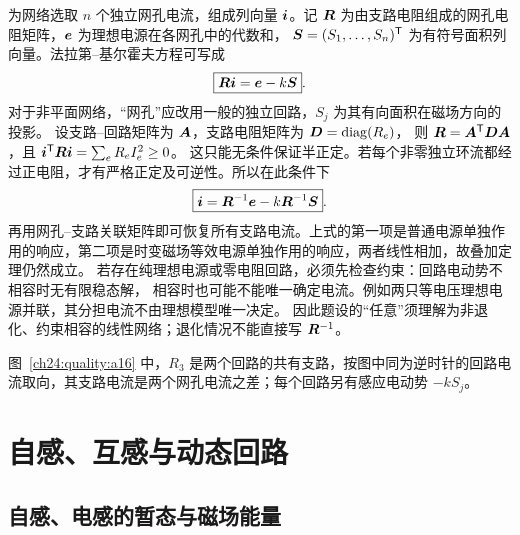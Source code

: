 {\begin{xesolution}
为网络选取 $n$ 个独立网孔电流，组成列向量 $\bm{i}$。记 $\bm{R}$ 为由支路电阻组成的网孔电阻矩阵，$\bm{e}$ 为理想电源在各网孔中的代数和，
$\bm{S}=(S_1,\ldots,S_n)^{\mathsf T}$ 为有符号面积列向量。法拉第--基尔霍夫方程可写成
\begin{equation}
  \boxed{\bm{R}\bm{i}=\bm{e}-k\bm{S}}.
\end{equation}
对于非平面网络，“网孔”应改用一般的独立回路，$S_j$ 为其有向面积在磁场方向的投影。
设支路--回路矩阵为 $\bm{A}$，支路电阻矩阵为 $\bm{D}=\operatorname{diag}(R_e)$，
则 $\bm{R}=\bm{A}^{\mathsf T}\bm{D}\bm{A}$，且
$\bm{i}^{\mathsf T}\bm{R}\bm{i}=\sum_eR_eI_e^2\ge0$。
这只能无条件保证半正定。若每个非零独立环流都经过正电阻，才有严格正定及可逆性。所以在此条件下
\begin{equation}
  \boxed{\bm{i}=\bm{R}^{-1}\bm{e}-k\bm{R}^{-1}\bm{S}}.
\end{equation}
再用网孔--支路关联矩阵即可恢复所有支路电流。上式的第一项是普通电源单独作用的响应，第二项是时变磁场等效电源单独作用的响应，两者线性相加，故叠加定理仍然成立。
若存在纯理想电源或零电阻回路，必须先检查约束：回路电动势不相容时无有限稳态解，
相容时也可能不能唯一确定电流。例如两只等电压理想电源并联，其分担电流不由理想模型唯一决定。
因此题设的“任意”须理解为非退化、约束相容的线性网络；退化情况不能直接写 $\bm{R}^{-1}$。

图~\ref{ch24:quality:a16} 中，$R_3$ 是两个回路的共有支路，按图中同为逆时针的回路电流取向，其支路电流是两个网孔电流之差；每个回路另有感应电动势 $-kS_j$。
\end{xesolution}



\section{自感、互感与动态回路}

\subsection{自感、电感的暂态与磁场能量}


}
